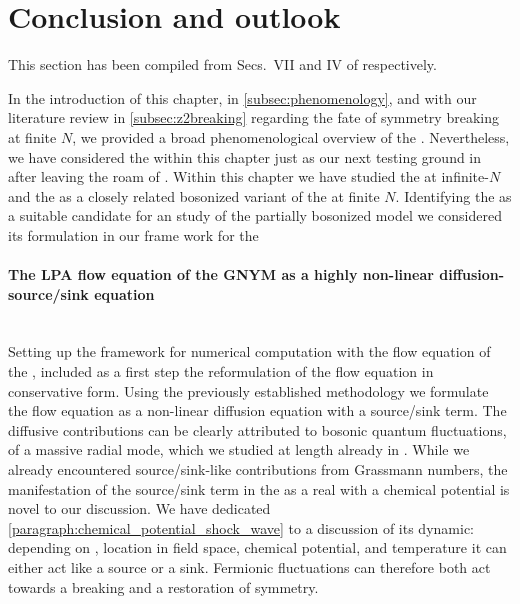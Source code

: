 \clearpage
\section{Conclusion and outlook}\label{sec:gnConclusion}
\begin{disclaimer}
	This section has been compiled from Secs.~VII and IV of  respectively.
\end{disclaimer}
In the introduction of this chapter, in \cref{subsec:phenomenology}, and with our literature review in \cref{subsec:z2breaking} \dash{} regarding the fate of \ZII{} symmetry breaking at finite $N$, we provided a broad phenomenological overview of the \gnm{}. Nevertheless, we have considered the \gnm{} within this chapter just as our next testing ground in \dtwo{} after leaving the roam of \dzero{}.
Within this chapter we have studied the \gnm{} at infinite-$N$ and the \gnym{} \dash{} as a closely related bosonized variant of the \gnm{} \dash{} at finite $N$.
Identifying the \gnym{} as a suitable candidate for an \lpa{} \frg{} study of the partially bosonized \gn{} model we considered its formulation in our \cfd{} frame work for the \frg{}

\paragraph{The LPA flow equation of the GNYM as a highly non-linear diffusion-source/sink equation}\label{paragraph:gnConSetup}\mbox{}\\%
Setting up the framework for numerical computation with the \lpa{} flow equation of the \gnym{}, included as a first step the reformulation of the flow equation in conservative form.
Using the previously established methodology we formulate the \lpa{} flow equation as a non-linear diffusion equation with a source/sink term.
The diffusive contributions can be clearly attributed to bosonic quantum fluctuations, of a massive radial mode, which we studied at length already in \dzero{}.
While we already encountered source/sink-like contributions from Grassmann numbers, the manifestation of the source/sink term in the \gnym{} as a real \qft{} with a chemical potential is novel to our discussion.
We have dedicated \cref{paragraph:chemical_potential_shock_wave} to a discussion of its dynamic: depending on \rgscale{}, location in field space, chemical potential, and temperature  it can either act like a source or a sink. Fermionic fluctuations can therefore both act towards a breaking and a restoration of \ZII{} symmetry.

